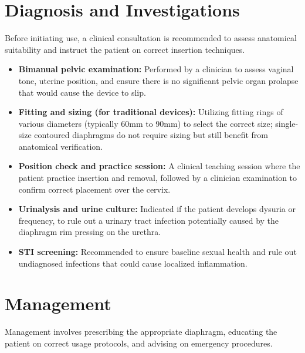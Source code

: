 \section*{Diagnosis and Investigations}
Before initiating use, a clinical consultation is recommended to assess anatomical suitability and instruct the patient on correct insertion techniques.

\begin{itemize}
    \item \textbf{Bimanual pelvic examination:} Performed by a clinician to assess vaginal tone, uterine position, and ensure there is no significant pelvic organ prolapse that would cause the device to slip.
    \item \textbf{Fitting and sizing (for traditional devices):} Utilizing fitting rings of various diameters (typically 60mm to 90mm) to select the correct size; single-size contoured diaphragms do not require sizing but still benefit from anatomical verification.
    \item \textbf{Position check and practice session:} A clinical teaching session where the patient practice insertion and removal, followed by a clinician examination to confirm correct placement over the cervix.
    \item \textbf{Urinalysis and urine culture:} Indicated if the patient develops dysuria or frequency, to rule out a urinary tract infection potentially caused by the diaphragm rim pressing on the urethra.
    \item \textbf{STI screening:} Recommended to ensure baseline sexual health and rule out undiagnosed infections that could cause localized inflammation.
\end{itemize}

\section*{Management}
Management involves prescribing the appropriate diaphragm, educating the patient on correct usage protocols, and advising on emergency procedures.

